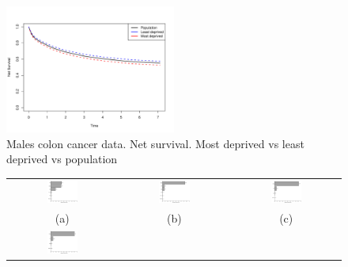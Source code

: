 \documentclass[12pt]{article}
\begin{document}
\begin{figure}[h!]
\centering
\includegraphics[width=0.5\textwidth]{nsdep15_males.pdf} 
\caption{ Males colon cancer data. Net survival. Most deprived vs least deprived vs population}
\label{fig:nsdep_males}
\end{figure}


\begin{figure}[h!]
\centering
\begin{tabular}{c c c}
\includegraphics[width=0.3\textwidth]{rpartvimp1_males.pdf} & 
\includegraphics[width=0.3\textwidth]{rpartvimp10_males.pdf} & 
\includegraphics[width=0.3\textwidth]{rpartvimp20_males.pdf}\\
 (a) & (b) & (c) \\
 \includegraphics[width=0.3\textwidth]{rpartvimp30_males.pdf} & 

\end{tabular}
\end{figure}
\end{document}
